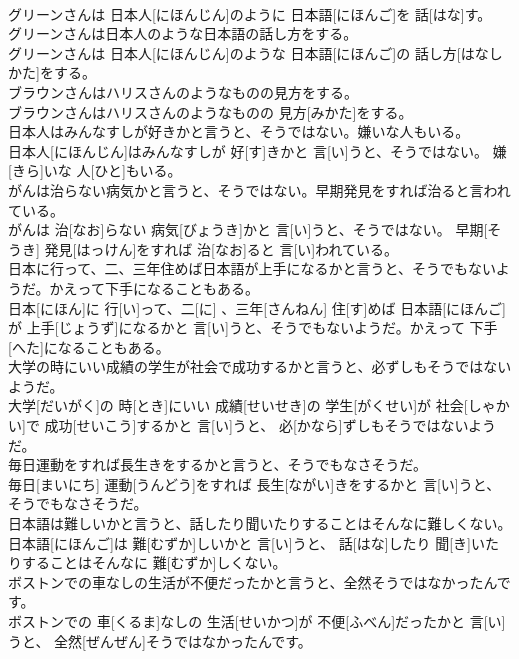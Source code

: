 \documentclass[8pt]{extreport}
\begin{document}
\begin{CJK}{UTF8}{min}
\\	グリーンさんは 日本人[にほんじん]のように 日本語[にほんご]を 話[はな]す。
\\	グリーンさんは日本人のような日本語の話し方をする。	
\\	グリーンさんは 日本人[にほんじん]のような 日本語[にほんご]の 話し方[はなしかた]をする。
\\	ブラウンさんはハリスさんのようなものの見方をする。	
\\	ブラウンさんはハリスさんのようなものの 見方[みかた]をする。
\\	日本人はみんなすしが好きかと言うと、そうではない。嫌いな人もいる。	
\\	日本人[にほんじん]はみんなすしが 好[す]きかと 言[い]うと、そうではない。 嫌[きら]いな 人[ひと]もいる。
\\	がんは治らない病気かと言うと、そうではない。早期発見をすれば治ると言われている。	
\\	がんは 治[なお]らない 病気[びょうき]かと 言[い]うと、そうではない。 早期[そうき] 発見[はっけん]をすれば 治[なお]ると 言[い]われている。
\\	日本に行って、二、三年住めば日本語が上手になるかと言うと、そうでもないようだ。かえって下手になることもある。	
\\	日本[にほん]に 行[い]って、二[に] 、三年[さんねん] 住[す]めば 日本語[にほんご]が 上手[じょうず]になるかと 言[い]うと、そうでもないようだ。かえって 下手[へた]になることもある。
\\	大学の時にいい成績の学生が社会で成功するかと言うと、必ずしもそうではないようだ。	
\\	大学[だいがく]の 時[とき]にいい 成績[せいせき]の 学生[がくせい]が 社会[しゃかい]で 成功[せいこう]するかと 言[い]うと、 必[かなら]ずしもそうではないようだ。
\\	毎日運動をすれば長生きをするかと言うと、そうでもなさそうだ。	
\\	毎日[まいにち] 運動[うんどう]をすれば 長生[ながい]きをするかと 言[い]うと、そうでもなさそうだ。
\\	日本語は難しいかと言うと、話したり聞いたりすることはそんなに難しくない。	
\\	日本語[にほんご]は 難[むずか]しいかと 言[い]うと、 話[はな]したり 聞[き]いたりすることはそんなに 難[むずか]しくない。
\\	ボストンでの車なしの生活が不便だったかと言うと、全然そうではなかったんです。	
\\	ボストンでの 車[くるま]なしの 生活[せいかつ]が 不便[ふべん]だったかと 言[い]うと、 全然[ぜんぜん]そうではなかったんです。

\end{CJK}
\end{document}
